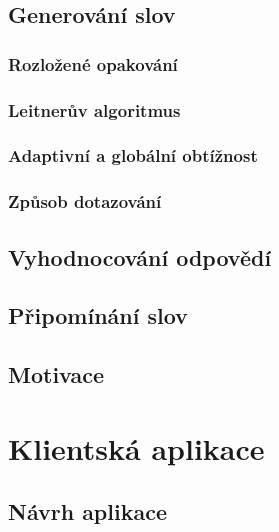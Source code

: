 \documentclass[a4paper,11pt,titlepage,fleqn]{article}
\begin{document}
    \subsection{Generování slov}

        \subsubsection{Rozložené opakování} %

        \subsubsection{Leitnerův algoritmus}

        \subsubsection{Adaptivní a globální obtížnost}

        \subsubsection{Způsob dotazování}
        

    \subsection{Vyhodnocování odpovědí}

    \subsection{Připomínání slov}

    \subsection{Motivace}


\newpage
\section{Klientská aplikace}

    \subsection{Návrh aplikace}
\end{document}
